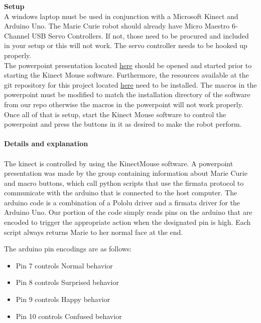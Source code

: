 \documentclass[12pt]{article}
\begin{document}
\begin{description}
		\textbf{Setup} \hfill \\
		A windows laptop must be used in conjunction with a Microsoft Kinect and Arduino Uno. The Marie Curie robot should already have Micro Maestro 6-Channel USB Servo Controllers. If not, those need to be procured and included in your setup or this will not work. The servo controller needs to be hooked up properly. \\
		The powerpoint presentation located \href{http://linktopowerpoint}{here} should be opened and started prior to starting the Kinect Mouse software. Furthermore, the resources available at the git repository for this project located \href{https://github.com/wrh2/ECE478/tree/master/Marie_Curie}{here} need to be installed. The macros in the powerpoint must be modified to match the installation directory of the software from our repo otherwise the macros in the powerpoint will not work properly. \\
		Once all of that is setup, start the Kinect Mouse software to control the powerpoint and press the buttons in it as desired to make the robot perform.\\ \\
		\textbf{Details and explanation} \hfill \\ \\
		The kinect is controlled by using the KinectMouse software. A powerpoint presentation was made by the group containing information about Marie Curie and macro buttons, which call python scripts that use the firmata protocol to communicate with the arduino that is connected to the host computer. The arduino code is a combination of a Pololu driver and a firmata driver for the Arduino Uno. Our portion of the code simply reads pins on the arduino that are encoded to trigger the appropriate action when the designated pin is high. Each script always returns Marie to her normal face at the end.
		
		The arduino pin encodings are as follows:
		\begin{itemize}
			\item Pin 7 controls Normal behavior
			\item Pin 8 controls Surprised behavior
			\item Pin 9 controls Happy behavior
			\item Pin 10 controls Confused behavior
		\end{itemize}


\end{description}
\end{document}
